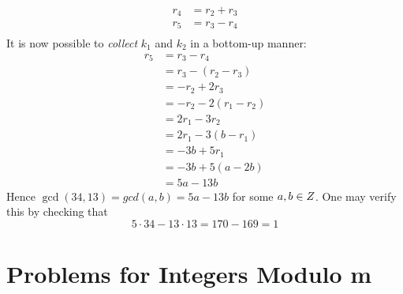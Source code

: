 \begin{remark}
\begin{equation}
\begin{aligned}
                r_4         &= r_2 + r_3 \\
                \boxed{r_5} &= r_3 - r_4 \\
                \phantom{}  &\phantom{}
            \end{aligned}
        \end{equation}
        It is now possible to \textit{collect} $k_1$ and $k_2$ in a bottom-up manner:
        \begin{align}
            \boxed{r_5} &= r_3 - r_4 \\
                        &= r_3 - (r_2 - r_3) \\
                        &= -r_2 + 2r_3 \\
                        &= -r_2 - 2(r_1 - r_2) \\
                        &= 2r_1 - 3r_2 \\
                        &= 2r_1 - 3(b - r_1) \\
                        &= -3b + 5r_1 \\
                        &= -3b + 5(a - 2b) \\
                        &= 5a - 13b
        \end{align}
        Hence $\gcd(34, 13) = gcd(a, b) = 5a - 13b$ for some $a, b \in \relax{Z}$. One may verify this by checking that
        \begin{equation}
            5 \cdot 34 - 13 \cdot 13 = 170 - 169 = 1
        \end{equation}
\end{remark}

\section{Problems for Integers Modulo m}

